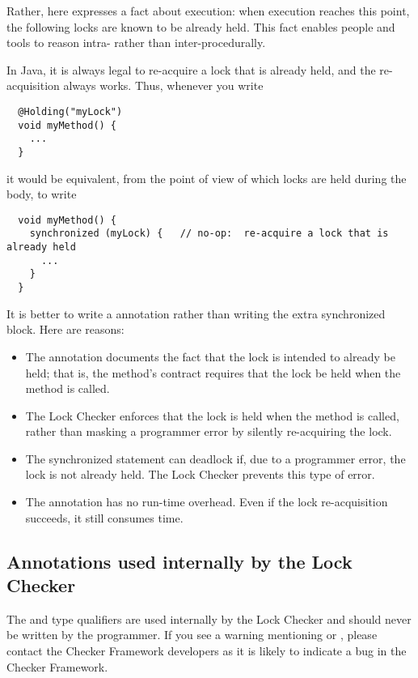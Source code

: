   Rather, here  expresses a fact about execution:  when
  execution reaches this point, the following locks are known to be already held.  This
  fact enables people and tools to reason intra- rather than
  inter-procedurally.

  In Java, it is always legal to re-acquire a lock that is already held,
  and the re-acquisition always works.  Thus, whenever you write

\begin{Verbatim}
  @Holding("myLock")
  void myMethod() {
    ...
  }
\end{Verbatim}

\noindent
it would be equivalent, from the point of view of which locks are held
during the body, to write

\begin{Verbatim}
  void myMethod() {
    synchronized (myLock) {   // no-op:  re-acquire a lock that is already held
      ...
    }
  }
\end{Verbatim}


It is better to write a  annotation rather than writing the
extra synchronized block.  Here are reasons:

\begin{itemize}
\item
  The annotation documents the fact that the lock is intended to already be
  held;  that is, the method's contract requires that the lock be held when
  the method is called.
\item
  The Lock Checker enforces that the lock is held when the method is
  called, rather than masking a programmer error by silently re-acquiring
  the lock.
\item
  The synchronized statement can deadlock if, due to a programmer error,
  the lock is not already held.  The Lock Checker prevents this type of
  error.
\item
  The annotation has no run-time overhead.  Even if the lock re-acquisition
  succeeds, it still consumes time.
\end{itemize}


\subsection{Annotations used internally by the Lock Checker\label{lock-internals}}

The  and  type qualifiers are used internally by the Lock Checker
and should never be written by the programmer.
If you
see a warning mentioning  or ,
please contact the Checker Framework developers as it is likely to
indicate a bug in the Checker Framework.


